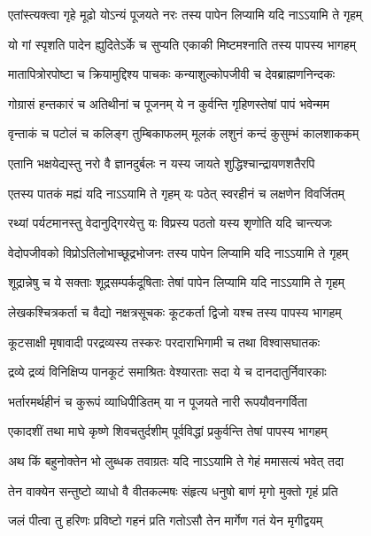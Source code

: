 \twolineshloka
{एतांस्त्यक्त्वा गृहे मूढो योऽन्यं पूजयते नरः}
{तस्य पापेन लिप्यामि यदि नाऽऽयामि ते गृहम्}%

\twolineshloka
{यो गां स्पृशति पादेन ह्युदितेऽर्के च सुप्यति}
{एकाकी मिष्टमश्नाति तस्य पापस्य भागहम्}%

\twolineshloka
{मातापित्रोरपोष्टा च क्रियामुद्दिश्य\footnotemark{} पाचकः}
{कन्याशुल्कोपजीवी च देवब्राह्मणनिन्दकः}%

\twolineshloka
{गोग्रासं हन्तकारं च अतिथीनां च पूजनम्}
{ये न कुर्वन्ति गृहिणस्तेषां पापं भवेन्मम}%

\twolineshloka
{वृन्ताकं च पटोलं च कलिङ्ग तुम्बिकाफलम्}
{मूलकं लशुनं कन्दं कुसुम्भं कालशाककम्}%

\twolineshloka
{एतानि भक्षयेद्यस्तु नरो वै ज्ञानदुर्बलः}
{न यस्य जायते शुद्धिश्चान्द्रायणशतैरपि}%

\twolineshloka
{एतस्य पातकं मह्यं यदि नाऽऽयामि ते गृहम्}
{यः पठेत् स्वरहीनं च लक्षणेन विवर्जितम्}%

\twolineshloka
{रथ्यां पर्यटमानस्तु वेदानुद्गिरयेत्तु यः}
{विप्रस्य पठतो यस्य शृणोति यदि चान्त्यजः}%

\twolineshloka
{वेदोपजीवको विप्रोऽतिलोभाच्छूद्रभोजनः}
{तस्य पापेन लिप्यामि यदि नाऽऽयामि ते गृहम्}%

\twolineshloka
{शूद्रान्नेषु च ये सक्ताः शूद्रसम्पर्कदूषिताः}
{तेषां पापेन लिप्यामि यदि नाऽऽयामि ते गृहम्}%

\twolineshloka
{लेखकश्चित्रकर्ता च वैद्यो नक्षत्रसूचकः}
{कूटकर्ता द्विजो यश्च तस्य पापस्य भागहम्}%

\twolineshloka
{कूटसाक्षी मृषावादी परद्रव्यस्य तस्करः}
{परदाराभिगामी च तथा विश्वासघातकः}%

\twolineshloka
{द्रव्ये द्रव्यं विनिक्षिप्य पानकूटं समाश्रितः}
{वेश्यारताः सदा ये च दानदातुर्निवारकाः}%

\twolineshloka
{भर्तारमर्थहीनं च कुरूपं व्याधिपीडितम्}
{या न पूजयते नारी रूपयौवनगर्विता}%

\twolineshloka
{एकादशीं तथा माघे कृष्णे शिवचतुर्दशीम्}
{पूर्वविद्धां प्रकुर्वन्ति तेषां पापस्य भागहम्}%

\twolineshloka
{अथ किं बहुनोक्तेन भो लुब्धक तवाग्रतः}
{यदि नाऽऽयामि ते गेहं ममासत्यं भवेत् तदा}%

\twolineshloka
{तेन वाक्येन सन्तुष्टो व्याधो वै वीतकल्मषः}
{संहृत्य धनुषो बाणं मृगो मुक्तो गृहं प्रति}%

\twolineshloka
{जलं पीत्वा तु हरिणः प्रविष्टो गहनं प्रति}
{गतोऽसौ तेन मार्गेण गतं येन मृगीद्वयम्}%

